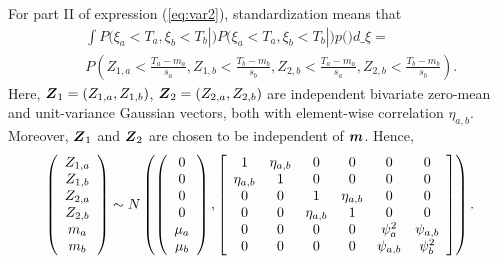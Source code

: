 \documentclass[aoas]{imsart}
\begin{document}
For part II of expression (\ref{eq:var2}), standardization means that
\begin{eqnarray}\label{part1:phi4}
&& \int P(\xi_a < T_a, \xi_b < T_b|\bm) P(\xi_a < T_a, \xi_b < T_b|\bm) p(\bm) d\bm_{\xi}= \nonumber \\
&& P\left( Z_{1,a} < \frac{T_a-m_{a}}{s_{a}}, 
Z_{1,b} < \frac{T_b-m_{b}}{s_{b}},Z_{2,b} < \frac{T_a-m_{a}}{s_{a}}, 
Z_{2,b} < \frac{T_b-m_{b}}{s_{b}} \right). \nonumber
\end{eqnarray}
Here,
${\boldsymbol Z}_1=(Z_{1,a},Z_{1,b})$, ${\boldsymbol Z}_2=(Z_{2,a},Z_{2,b})$ are independent bivariate zero-mean and unit-variance Gaussian vectors, both with element-wise correlation
$\eta_{a,b}$. Moreover, ${\boldsymbol Z}_1$ and ${\boldsymbol Z}_2$ are chosen to be independent of ${\boldsymbol m}$. Hence,
\begin{equation}
    \left(
    \begin{array}{cccccc}
         Z_{1,a} \\
         Z_{1,b} \\
         Z_{2,a} \\
         Z_{2,b} \\
         m_{a} \\
         m_{b}
    \end{array}
    \right)
\sim N \left(
\left(
    \begin{array}{cccccc}
    0 \\
    0 \\
    0 \\
    0 \\
          \mu_{a} \\
         \mu_{b} 
    \end{array}
    \right),
   \left[ 
      \begin{array}{cccccc}
        1 & \eta_{a,b} & 0 & 0 & 0 & 0  \\
        \eta_{a,b} & 1 & 0 & 0 & 0 & 0 \\
        0 & 0 & 1 & \eta_{a,b} & 0 & 0 \\
        0 & 0 & \eta_{a,b} & 1 & 0 & 0 \\
        0 & 0 & 0 & 0 & \psi^2_{a} & \psi_{a,b} \\
        0 & 0 & 0 & 0 & \psi_{a,b} & \psi^2_{b} 
    \end{array}
\right]
\right).
\vspace{0.2cm}
\end{equation}
\end{document}
